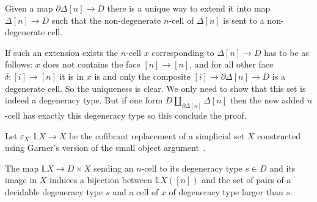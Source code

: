 \documentclass[reqno,10pt,a4paper,oneside,draft]{amsart}
\makeatletter
\renewenvironment{proof}[1][\proofname] {\par\pushQED{\qed}\normalfont\topsep6\p@\@plus6\p@\relax\trivlist\item[\hskip\labelsep\bf#1\@addpunct{.}]\ignorespaces}{\popQED\endtrivlist\@endpefalse}
\numberwithin{equation}{section}
\theoremstyle{mythm}
\theoremstyle{mydef}
\theoremstyle{myrmk}
\newcommand{\co}{\colon}
\makeatother
\begin{document}
\begin{lemma} \label{lem:D_contractible}
Given a map $\partial \Delta[n] \rightarrow D$ there is a unique way to extend it into map $\Delta[n] \rightarrow D$ such that the non-degenerate $n$-cell of $\Delta[n]$ is sent to a non-degenerate cell.
\end{lemma}

\begin{proof}
If such an extension exists the $n$-cell $x$ corresponding to $\Delta[n] \rightarrow D$ has to be as follows: $x$ does not contains the face $[n] \rightarrow [n]$, and for all other face $\delta:[i] \rightarrow [n]$ it is in $x$ is and only the composite $[i] \rightarrow \partial \Delta[n] \rightarrow D$ is a degenerate cell. So the uniqueness is clear. We only need to show that this set is indeed a degeneracy type. But if one form $D \coprod_{\partial \Delta[n]} \Delta[n]$ then the new added $n$-cell has exactly this degeneracy type so this conclude the proof.
\end{proof}

Let $\varepsilon_X \co \mathbb{L} X \to X$ be the cofibrant replacement of a simplicial set $X$ constructed using  Garner's version of the small object argument~\cite{garner:small-object-argument}.

\begin{proposition} \label{prop:Cof_replacement}
The map $\mathbb{L} X \rightarrow D \times X$ sending an $n$-cell to its degeneracy type $s \in D$ and its image in $X$ induces a bijection between $\mathbb{L}X([n])$ and the set of pairs of a decidable degeneracy type $s$ and a cell of $x$ of degeneracy type larger than $s$.
\end{proposition}
\end{document}
